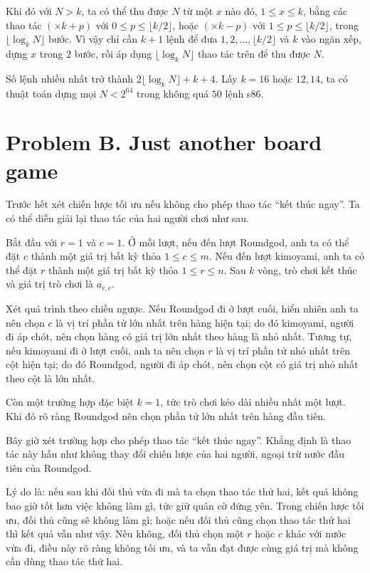 \documentclass[11pt]{article}
\begin{document}
Khi đó với $N>k$, ta có thể thu được $N$ từ một $x$ nào đó,
$1\le x\le k$, bằng các thao tác $(\times k+p)$ với
$0\le p\le\lfloor k/2\rfloor$, hoặc $(\times k-p)$ với
$1\le p\le\lfloor k/2\rfloor$, trong $\lfloor\log_k N\rfloor$ bước. Vì vậy
chỉ cần $k+1$ lệnh để đưa $1,2,\ldots,\lfloor k/2\rfloor$ và $k$ vào ngăn
xếp, dựng $x$ trong $2$ bước, rồi áp dụng $\lfloor\log_k N\rfloor$ thao tác
trên để thu được $N$.

Số lệnh nhiều nhất trở thành $2\lfloor\log_k N\rfloor+k+4$. Lấy
$k=16$ hoặc $12,14$, ta có thuật toán dựng mọi $N<2^{64}$ trong không quá
$50$ lệnh s86.

\section{Problem B. Just another board game}

Trước hết xét chiến lược tối ưu nếu không cho phép thao tác ``kết thúc ngay''.
Ta có thể diễn giải lại thao tác của hai người chơi như sau.

Bắt đầu với $r=1$ và $c=1$. Ở mỗi lượt, nếu đến lượt Roundgod, anh ta có thể
đặt $c$ thành một giá trị bất kỳ thỏa $1\le c\le m$. Nếu đến lượt kimoyami,
anh ta có thể đặt $r$ thành một giá trị bất kỳ thỏa $1\le r\le n$. Sau $k$
vòng, trò chơi kết thúc và giá trị trò chơi là $a_{r,c}$.

Xét quá trình theo chiều ngược. Nếu Roundgod đi ở lượt cuối, hiển nhiên anh ta
nên chọn $c$ là vị trí phần tử lớn nhất trên hàng hiện tại; do đó kimoyami,
người đi áp chót, nên chọn hàng có giá trị lớn nhất theo hàng là nhỏ nhất.
Tương tự, nếu kimoyami đi ở lượt cuối, anh ta nên chọn $r$ là vị trí phần tử
nhỏ nhất trên cột hiện tại; do đó Roundgod, người đi áp chót, nên chọn cột có
giá trị nhỏ nhất theo cột là lớn nhất.

Còn một trường hợp đặc biệt $k=1$, tức trò chơi kéo dài nhiều nhất một lượt.
Khi đó rõ ràng Roundgod nên chọn phần tử lớn nhất trên hàng đầu tiên.

Bây giờ xét trường hợp cho phép thao tác ``kết thúc ngay''. Khẳng định là
thao tác này hầu như không thay đổi chiến lược của hai người, ngoại trừ nước
đầu tiên của Roundgod.

Lý do là: nếu sau khi đối thủ vừa đi mà ta chọn thao tác thứ hai, kết quả
không bao giờ tốt hơn việc không làm gì, tức giữ quân cờ đứng yên. Trong
chiến lược tối ưu, đối thủ cũng sẽ không làm gì; hoặc nếu đối thủ cũng chọn
thao tác thứ hai thì kết quả vẫn như vậy. Nếu không, đối thủ chọn một $r$
hoặc $c$ khác với nước vừa đi, điều này rõ ràng không tối ưu, và ta vẫn đạt
được cùng giá trị mà không cần dùng thao tác thứ hai.
\end{document}
